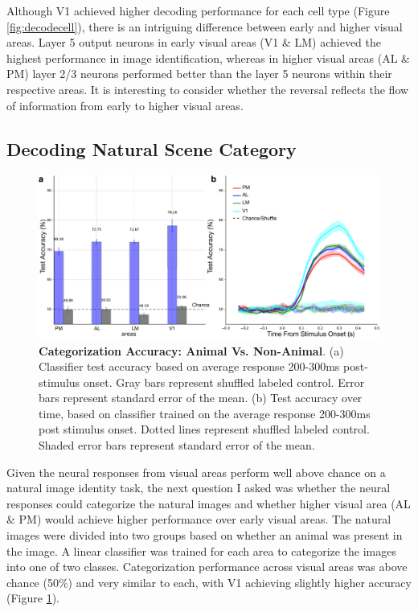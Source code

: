 Although V1 achieved higher decoding performance for each cell type (Figure \ref{fig:decodecell}), there is an intriguing difference between early and higher visual areas. Layer 5 output neurons in early visual areas (V1 \& LM) achieved the highest performance in image identification, whereas in higher visual areas (AL \& PM) layer 2/3 neurons performed better than the layer 5 neurons within their respective areas. It is interesting to consider whether the reversal reflects the flow of information from early to higher visual areas. \par 

\subsection{Decoding Natural Scene Category}
\begin{figure}
  \centering
     \includegraphics[width=\textwidth]{Figures/chapter5/accuracy_categorization.png}
  \caption[Categorization Accuracy: Animal Vs. Non-Animal]{\textbf{Categorization Accuracy: Animal Vs. Non-Animal}. (a) Classifier test accuracy based on average response 200-300ms post-stimulus onset. Gray bars represent shuffled labeled control. Error bars represent standard error of the mean. (b) Test accuracy over time, based on classifier trained on the average response 200-300ms post stimulus onset. Dotted lines represent shuffled labeled control. Shaded error bars represent standard error of the mean.}
   \label{fig:decodecategory}
\end{figure}
Given the neural responses from visual areas perform well above chance on a natural image identity task, the next question I asked was whether the neural responses could categorize the natural images and whether higher visual area (AL \& PM) would achieve higher performance over early visual areas. The natural images were divided into two groups based on whether an animal was present in the image. A linear classifier was trained for each area to categorize the images into one of two classes. Categorization performance across visual areas was above chance (50\%) and very similar to each, with V1 achieving slightly higher accuracy (Figure \ref{fig:decodecategory}).  

